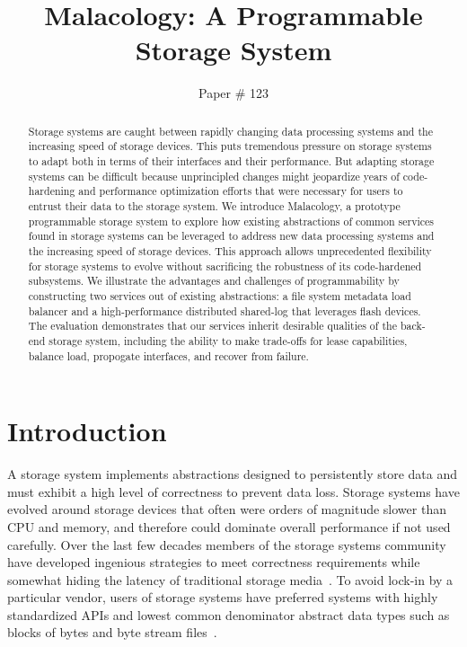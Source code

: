 \documentclass[10pt,twocolumn]{article}
\title{Malacology: A Programmable Storage System}
\author{Paper \# 123}
\date{}
\begin{document}
\maketitle

\begin{abstract}
Storage systems are caught between rapidly changing data
processing systems and the increasing speed of storage devices. This puts
tremendous pressure on storage systems to adapt both in terms of their
interfaces and their performance. But adapting storage systems can be difficult
because unprincipled changes might jeopardize years of code-hardening and
performance optimization efforts that were necessary for users to entrust their
data to the storage system.  We introduce  Malacology, a prototype programmable
storage system to explore how existing abstractions of common services found in
storage systems can be leveraged to address new data processing systems and the
increasing speed of storage devices. This approach allows unprecedented
flexibility for storage systems to evolve without sacrificing the robustness of
its code-hardened subsystems.  We illustrate the advantages and challenges of
programmability by constructing two services out of existing abstractions: a
file system metadata load balancer and a high-performance distributed
shared-log that leverages flash devices. The evaluation demonstrates that our
services inherit desirable qualities of the back-end storage system, including
the ability to make trade-offs for lease capabilities, balance load, propogate
interfaces, and recover from failure.
\end{abstract}

\section{Introduction}
\label{introduction}
\label{sec:intro}

A storage system implements abstractions designed to persistently store data
and must exhibit a high level of correctness to prevent data loss.  Storage
systems have evolved around storage devices that often were orders of magnitude
slower than CPU and memory, and therefore could dominate overall performance if
not used carefully. Over the last few decades members of the storage systems
community have developed ingenious strategies to meet correctness requirements
while somewhat hiding the latency of traditional storage
media~\cite{brewer_disks_2016}. To avoid lock-in by a particular vendor, users
of storage systems have preferred systems with highly standardized APIs and
lowest common denominator abstract data types such as blocks of bytes and byte
stream files~\cite{armbrust_view_2010}.
\end{document}
